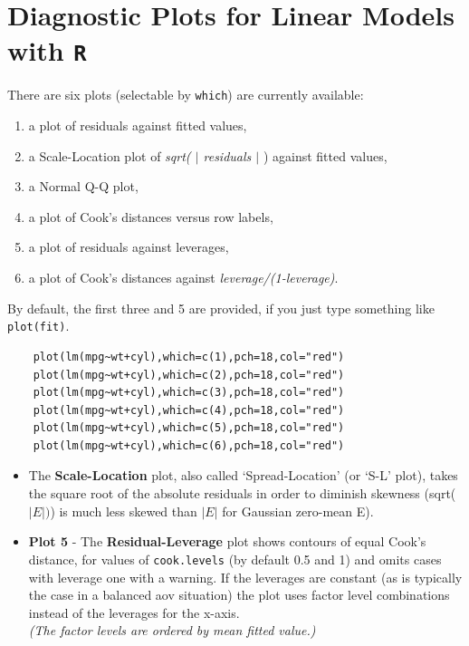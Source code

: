 \documentclass[residuals.tex]{subfiles}
\begin{document}
\Large
\newpage
\section{Diagnostic Plots for Linear Models with \texttt{R}}

There are six plots (selectable by \texttt{which}) are currently available: 
\begin{enumerate}
	\item a plot of residuals against fitted values, 
	\item a Scale-Location plot of \textit{sqrt( $|$ residuals $|$ }) against fitted values, 
	\item a Normal Q-Q plot, 
	\item a plot of Cook's distances versus row labels, 
	\item a plot of residuals against leverages, 
	\item a plot of Cook's distances against \textit{leverage/(1-leverage)}.
\end{enumerate} 

\noindent By default, the first three and 5 are provided, if you just type something like \texttt{plot(fit)}.
\begin{framed}
	\begin{verbatim}
	plot(lm(mpg~wt+cyl),which=c(1),pch=18,col="red")
	plot(lm(mpg~wt+cyl),which=c(2),pch=18,col="red")
	plot(lm(mpg~wt+cyl),which=c(3),pch=18,col="red")
	plot(lm(mpg~wt+cyl),which=c(4),pch=18,col="red")
	plot(lm(mpg~wt+cyl),which=c(5),pch=18,col="red")
	plot(lm(mpg~wt+cyl),which=c(6),pch=18,col="red")
	\end{verbatim}
\end{framed}
\newpage
\begin{itemize}
	\item
	The \textbf{Scale-Location} plot, also called ‘Spread-Location’ (or ‘S-L’ plot), takes the square root of the absolute residuals in order to diminish skewness (sqrt($|E|)$) is much less skewed than $| E |$ for Gaussian zero-mean E).
	
	\item \textbf{Plot 5} - 
	The \textbf{Residual-Leverage} plot shows contours of equal Cook's distance, for values of \texttt{cook.levels} (by default 0.5 and 1) and omits cases with leverage one with a warning. If the leverages are constant (as is typically the case in a balanced aov situation) the plot uses factor level combinations instead of the leverages for the x-axis. \\
	\textit{(The factor levels are ordered by mean fitted value.)}
\end{itemize}
\end{document}
